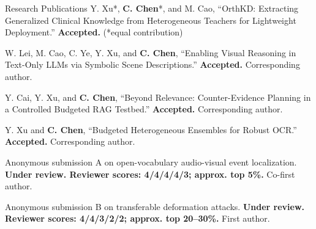 \begin{rubric}{Research Publications}
  Y. Xu*, \textbf{C. Chen}*, and M. Cao, ``OrthKD: Extracting Generalized Clinical Knowledge from Heterogeneous Teachers for Lightweight Deployment.'' \textbf{Accepted.} (*equal contribution)

  W. Lei, M. Cao, C. Ye, Y. Xu, and \textbf{C. Chen}, ``Enabling Visual Reasoning in Text-Only LLMs via Symbolic Scene Descriptions.'' \textbf{Accepted.} Corresponding author.

\entry*[ICANN 2026]
  Y. Cai, Y. Xu, and \textbf{C. Chen}, ``Beyond Relevance: Counter-Evidence Planning in a Controlled Budgeted RAG Testbed.'' \textbf{Accepted.} Corresponding author.

\entry*[ICANN 2026]
  Y. Xu and \textbf{C. Chen}, ``Budgeted Heterogeneous Ensembles for Robust OCR.'' \textbf{Accepted.} Corresponding author.

\entry*[ACM MM 2026]
  Anonymous submission A on open-vocabulary audio-visual event localization. \textbf{Under review. Reviewer scores: 4/4/4/4/3; approx. top 5\%.} Co-first author.

\entry*[ACM MM 2026]
  Anonymous submission B on transferable deformation attacks. \textbf{Under review. Reviewer scores: 4/4/3/2/2; approx. top 20--30\%.} First author.
\end{rubric}
